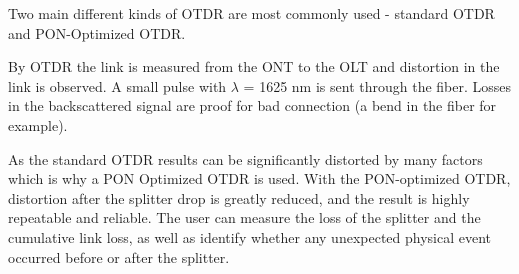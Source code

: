 Two main different kinds of OTDR are most commonly used - standard OTDR and PON-Optimized OTDR.

By OTDR the link is measured from the ONT to the OLT and distortion in the link is observed. A small pulse with $\lambda$ = 1625 nm is sent through the fiber. Losses in the backscattered signal are proof for bad connection (a bend in the fiber for example).

As the standard OTDR results can be significantly distorted by many factors which is why a PON Optimized OTDR is used. With the PON-optimized OTDR, distortion after the splitter drop is greatly reduced, and the result is highly repeatable and reliable. The user can measure the loss of the splitter and the cumulative link loss, as well as identify whether any unexpected physical event occurred before or after the splitter.







